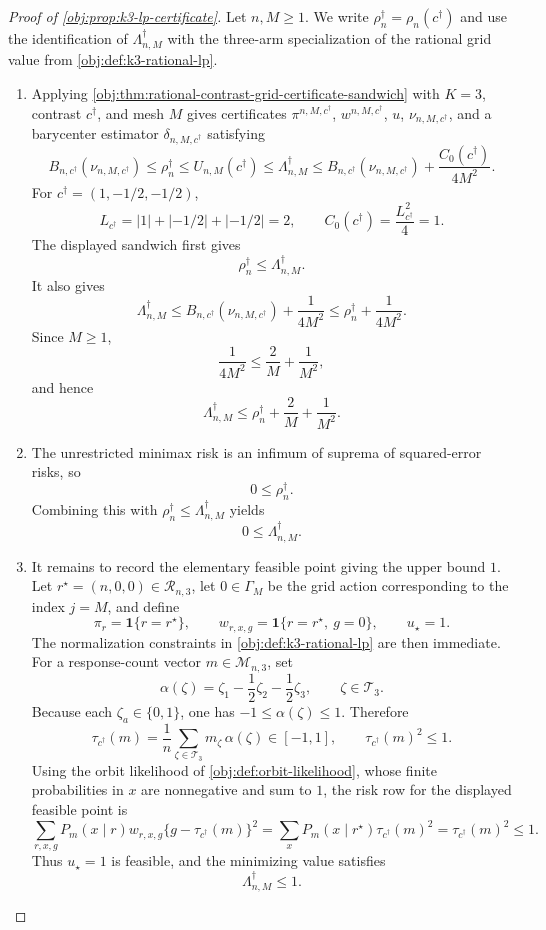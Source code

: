 \documentclass[11pt]{article}
\begin{document}
\begin{proof}[Proof of \cref{obj:prop:k3-lp-certificate}]
Let \(n,M\ge 1\).  We write \(\rho_n^\dagger=\rho_n(c^\dagger)\) and use the identification of \(\Lambda_{n,M}^\dagger\) with the three-arm specialization of the rational grid value from \cref{obj:def:k3-rational-lp}.

\begin{enumerate}
\item Applying \cref{obj:thm:rational-contrast-grid-certificate-sandwich} with \(K=3\), contrast \(c^\dagger\), and mesh \(M\) gives certificates \(\pi^{n,M,c^\dagger}\), \(w^{n,M,c^\dagger}\), \(u\), \(\nu_{n,M,c^\dagger}\), and a barycenter estimator \(\delta_{n,M,c^\dagger}\) satisfying
\[
B_{n,c^\dagger}(\nu_{n,M,c^\dagger})
\le
\rho_n^\dagger
\le
U_{n,M}(c^\dagger)
\le
\Lambda_{n,M}^\dagger
\le
B_{n,c^\dagger}(\nu_{n,M,c^\dagger})
+\frac{C_0(c^\dagger)}{4M^2}.
\]
For \(c^\dagger=(1,-1/2,-1/2)\),
\[
L_{c^\dagger}=|1|+|-1/2|+|-1/2|=2,
\qquad
C_0(c^\dagger)=\frac{L_{c^\dagger}^2}{4}=1 .
\]
The displayed sandwich first gives
\[
\rho_n^\dagger\le \Lambda_{n,M}^\dagger .
\]
It also gives
\[
\Lambda_{n,M}^\dagger
\le
B_{n,c^\dagger}(\nu_{n,M,c^\dagger})+\frac{1}{4M^2}
\le
\rho_n^\dagger+\frac{1}{4M^2}.
\]
Since \(M\ge1\),
\[
\frac{1}{4M^2}\le \frac{2}{M}+\frac{1}{M^2},
\]
and hence
\[
\Lambda_{n,M}^\dagger
\le
\rho_n^\dagger+\frac{2}{M}+\frac{1}{M^2}.
\]

\item The unrestricted minimax risk is an infimum of suprema of squared-error risks, so
\[
0\le \rho_n^\dagger .
\]
Combining this with \(\rho_n^\dagger\le\Lambda_{n,M}^\dagger\) yields
\[
0\le\Lambda_{n,M}^\dagger .
\]

\item It remains to record the elementary feasible point giving the upper bound \(1\).  Let \(r^\star=(n,0,0)\in\mathcal R_{n,3}\), let \(0\in\Gamma_M\) be the grid action corresponding to the index \(j=M\), and define
\[
\pi_r=\mathbf 1\{r=r^\star\},
\qquad
w_{r,x,g}=\mathbf 1\{r=r^\star,\ g=0\},
\qquad
u_\star=1 .
\]
The normalization constraints in \cref{obj:def:k3-rational-lp} are then immediate.  For a response-count vector \(m\in\mathcal M_{n,3}\), set
\[
\alpha(\zeta)=\zeta_1-\frac12\zeta_2-\frac12\zeta_3,
\qquad \zeta\in\mathcal T_3 .
\]
Because each \(\zeta_a\in\{0,1\}\), one has \(-1\le\alpha(\zeta)\le1\).  Therefore
\[
\tau_{c^\dagger}(m)
=
\frac1n\sum_{\zeta\in\mathcal T_3}m_\zeta\,\alpha(\zeta)
\in[-1,1],
\qquad
\tau_{c^\dagger}(m)^2\le1 .
\]
Using the orbit likelihood of \cref{obj:def:orbit-likelihood}, whose finite probabilities in \(x\) are nonnegative and sum to \(1\), the risk row for the displayed feasible point is
\[
\sum_{r,x,g}P_m(x\mid r)w_{r,x,g}
\{g-\tau_{c^\dagger}(m)\}^2
=
\sum_x P_m(x\mid r^\star)\tau_{c^\dagger}(m)^2
=
\tau_{c^\dagger}(m)^2
\le 1 .
\]
Thus \(u_\star=1\) is feasible, and the minimizing value satisfies
\[
\Lambda_{n,M}^\dagger\le1 .
\]


\end{enumerate}
\end{proof}
\end{document}
